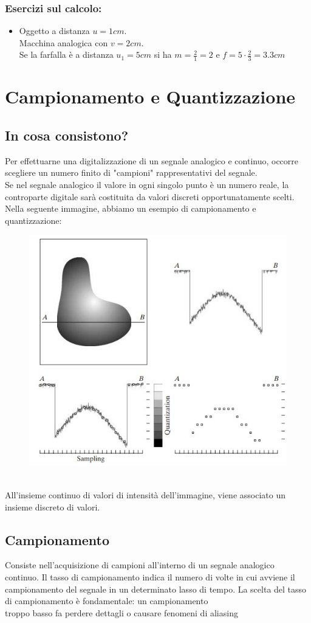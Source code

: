 \documentclass{report}
\begin{document}
	\subsection{Esercizi sul calcolo:}
	\begin{itemize}
		\item 
		      		      
		      Oggetto a distanza $u=1cm$.\\
		      Macchina analogica con $v=2cm$.\\
		      Se la farfalla è a distanza $u_1=5cm$ si ha $m=\frac{2}{1}=2$ e $f=5 \cdot \frac{2}{3}=3.3cm$
	\end{itemize}
	\newpage
	\chapter{Campionamento e Quantizzazione}
	\section{In cosa consistono?}
	Per effettuarne una digitalizzazione di un segnale analogico e continuo, occorre scegliere un numero finito di "campioni" rappresentativi del segnale.\\
	Se nel segnale analogico il valore in ogni singolo punto è un numero reale, la controparte digitale sarà costituita da valori discreti opportunatamente scelti.
	Nella seguente immagine, abbiamo un esempio di campionamento e quantizzazione:
	\begin{figure}[htp]
		\centering
		\includegraphics[width=0.6\linewidth]{Basic-Concepts-in-Sampling-and-Quantization.jpeg}
	\end{figure}\\
	All'insieme continuo di valori di intensità dell'immagine, viene associato un insieme discreto di valori.
	\section{Campionamento}
	Consiste nell'acquisizione di campioni all'interno di un segnale analogico continuo. Il tasso di campionamento indica il numero di volte in cui avviene il campionamento del segnale in un determinato lasso di tempo.
	La scelta del tasso di campionamento è fondamentale:
	un campionamento \\troppo basso fa perdere dettagli o causare fenomeni di aliasing
\end{document}
